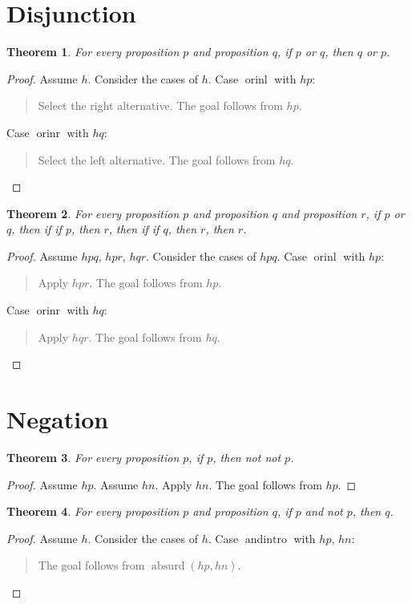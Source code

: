 \documentclass[11pt]{article}
\newtheorem{theorem}{Theorem}[section]
\theoremstyle{definition}
\begin{document}
\section{Disjunction}
\label{ll:main:disjunction}
\begin{theorem}
\label{ll:main:or-comm}
For every proposition \(p\) and proposition \(q\), if \(p\) or \(q\), then \(q\) or \(p\).
\end{theorem}
\begin{proof}
Assume \(h\).
Consider the cases of \(h\).
Case \(\operatorname{orinl}\) with \(hp\):
\begin{quote}
Select the right alternative.
The goal follows from \(hp\).
\end{quote}
Case \(\operatorname{orinr}\) with \(hq\):
\begin{quote}
Select the left alternative.
The goal follows from \(hq\).
\end{quote}
\end{proof}
\begin{theorem}
\label{ll:main:or-elim}
For every proposition \(p\) and proposition \(q\) and proposition \(r\), if \(p\) or \(q\), then if if \(p\), then \(r\), then if if \(q\), then \(r\), then \(r\).
\end{theorem}
\begin{proof}
Assume \(hpq\), \(hpr\), \(hqr\).
Consider the cases of \(hpq\).
Case \(\operatorname{orinl}\) with \(hp\):
\begin{quote}
Apply \(hpr\).
The goal follows from \(hp\).
\end{quote}
Case \(\operatorname{orinr}\) with \(hq\):
\begin{quote}
Apply \(hqr\).
The goal follows from \(hq\).
\end{quote}
\end{proof}
\section{Negation}
\label{ll:main:negation}
\begin{theorem}
\label{ll:main:double-negation-intro}
For every proposition \(p\), if \(p\), then not not \(p\).
\end{theorem}
\begin{proof}
Assume \(hp\).
Assume \(hn\).
Apply \(hn\).
The goal follows from \(hp\).
\end{proof}
\begin{theorem}
\label{ll:main:explosion}
For every proposition \(p\) and proposition \(q\), if \(p\) and not \(p\), then \(q\).
\end{theorem}
\begin{proof}
Assume \(h\).
Consider the cases of \(h\).
Case \(\operatorname{andintro}\) with \(hp\), \(hn\):
\begin{quote}
The goal follows from \(\operatorname{absurd}(hp, hn)\).
\end{quote}
\end{proof}
\end{document}
